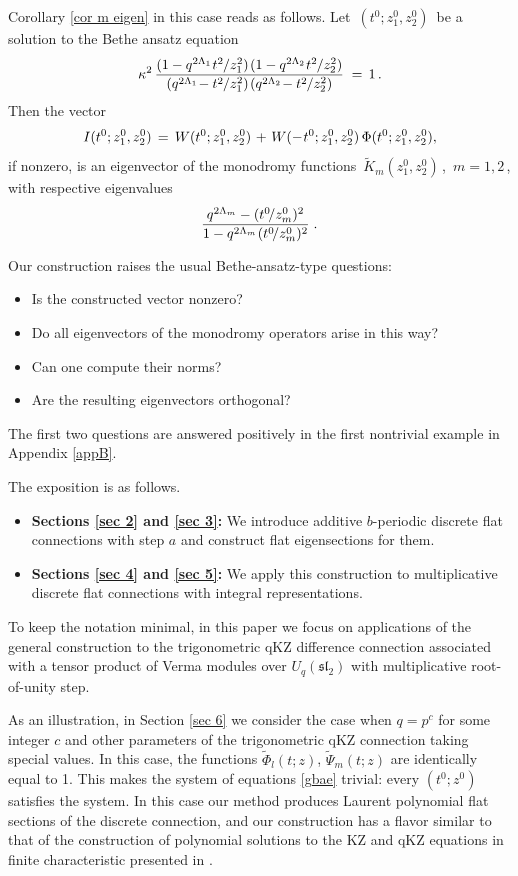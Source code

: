 \documentclass[12pt]{amsart}
\def\>{\relax\ifmmode\mskip.666667\thinmuskip\relax\else\kern.111111em\fi}
\def\<{\relax\ifmmode\mskip-.333333\thinmuskip\relax\else\kern-.0555556em\fi}
\theoremstyle{definition} %
\numberwithin{equation}{section}
\theoremstyle{definition}
\let\ka\kappa
\let\La\Lambda
\def\be{\begin{equation*}}
\def\ee{\end{equation*}}
\begin{document}
\smallskip
\noindent
Corollary \ref{cor m eigen} in this case reads as follows.
Let \,$(t^0; z_1^0,z_2^0)$ \,be a solution to the Bethe ansatz equation
\be
\ka^2\,\frac{(1-q^{2\La_1}\<\>t^2\</z_1^2)\>(1-q^{2\La_2}\<\>t^2\</z_2^2)}
{(q^{2\La_1}\!-t^2\</z_1^2)\>(q^{2\La_2}\!-t^2\</z_2^2)}\;=\,1\,.
\ee
Then the vector
\be
I(t^0;z_1^{0},z_2^0)\,=\,W(t^0;z_1^0,z_2^0)\>+\>
W(-\<\>t^0;z_1^0,z_2^0)\,\Phi(t^0;z_1^0,z_2^0),
\ee
if nonzero, is an eigenvector of the monodromy functions \,$\tilde K_m(z_1^0,z_2^0)$\,,
\,$m=1,2$\,, with respective eigenvalues
\be
\frac{q^{2\Lambda_m}-(t^0\!/z^0_m)^2}
{1-q^{2\La_m}\<\>(t^0\!/z^0_m)^2}\;.
\ee

\bigskip

Our construction raises the usual Bethe-ansatz-type questions:
\begin{itemize}
\item
Is the constructed vector nonzero?
\item Do all eigenvectors of the monodromy operators arise in this way?
\item Can one compute their norms?
\item Are the resulting eigenvectors orthogonal?
\end{itemize}
\medskip

The first two questions are answered positively in the first nontrivial example in Appendix \ref{appB}.

\medskip


The exposition is as follows.
\begin{itemize}
\item \textbf{Sections \ref{sec 2} and \ref{sec 3}:} We introduce additive $b$-periodic discrete flat connections with step $a$ and construct flat eigensections for them.
\item \textbf{Sections \ref{sec 4} and \ref{sec 5}:} We apply this construction to multiplicative
discrete flat connections with integral representations.
\end{itemize}

To keep the notation minimal, in this paper we focus on applications of the general construction
 to  the trigonometric qKZ difference connection
associated with a tensor product of Verma modules over
$U_q(\mathfrak{sl}_2)$ with multiplicative root-of-unity step.

\smallskip

As an illustration, in Section \ref{sec 6} we consider the case when $q = p^c$ for some integer $c$ and other parameters of the trigonometric qKZ connection taking special values. In this case, the functions $\tilde\Phi_l(t;z)$, $\tilde\Psi_m(t;z)$ are identically equal to 1. This makes the system of equations \eqref{gbae} trivial: every $(t^0; z^0)$ satisfies the system. In this case our method produces Laurent polynomial flat sections of the discrete connection, and our construction has a flavor similar to that of the construction of polynomial solutions to the KZ and qKZ equations in finite characteristic presented in \cite{SV, MV1}.
\end{document}
